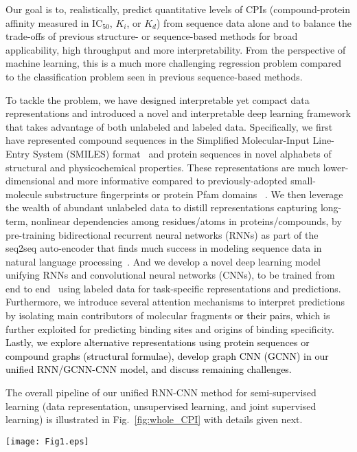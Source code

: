 \documentclass[nocrop]{bioinfo}
\newcommand{\red}[1]{\textcolor{black}{#1}}
\begin{document}
Our goal is to, realistically, predict quantitative levels of CPIs  (compound-protein affinity measured in IC$_{50}$, $K_i$, or $K_d$) from sequence data alone and to balance the trade-offs of previous structure- or sequence-based methods for broad applicability, high throughput and more interpretability. From the perspective of machine learning, this is a much more challenging regression problem compared to the classification problem seen in previous sequence-based methods. 

To tackle the problem, we have designed interpretable yet compact data representations and introduced a novel and interpretable deep learning framework that takes advantage of both unlabeled and labeled data. 
Specifically, we first have represented compound sequences in the Simplified Molecular-Input Line-Entry System  (SMILES) format~\citep{weininger1988smiles} and protein sequences in novel alphabets of structural and physicochemical properties. These representations are much lower-dimensional and more informative compared to previously-adopted small-molecule substructure fingerprints or protein Pfam domains ~\citep{tian2016boosting}. We then leverage the wealth of abundant unlabeled data to distill representations capturing long-term, nonlinear dependencies among residues/atoms in proteins/compounds, by pre-training bidirectional recurrent neural networks  (RNNs) as part of the seq2seq auto-encoder that finds much success in modeling sequence data in natural language processing~\citep{kalchbrenner2013recurrent}. And we develop a novel deep learning model unifying RNNs and convolutional neural networks  (CNNs), to be trained from end to end~\citep{wang2016studying} using labeled data for task-specific representations and predictions. Furthermore, we introduce \red{several} attention mechanisms to interpret predictions by isolating main contributors of molecular fragments \red{or their pairs}, which is further exploited for predicting binding sites and origins of binding specificity.  \red{Lastly, we explore alternative representations using  protein sequences or compound graphs  (structural formulae), develop graph CNN (GCNN) in our unified RNN/GCNN-CNN model, and discuss remaining challenges.}

The overall pipeline of our unified RNN-CNN method for semi-supervised learning  (data representation, unsupervised learning, and joint supervised learning) is illustrated in Fig.~\ref{fig:whole_CPI} with details given next. 


\begin{figure*}[htb]
    \centering
     \vspace{-2em}
    \texttt{[image: Fig1.eps]}
        \vspace{-2em}
    \caption{The pipeline of our unified RNN-CNN method to predict \red{and interpret} compound-protein affinity.}
    \vspace{-1em}
    \label{fig:whole_CPI}
     \vspace{-1em}
\end{figure*}
\end{document}
